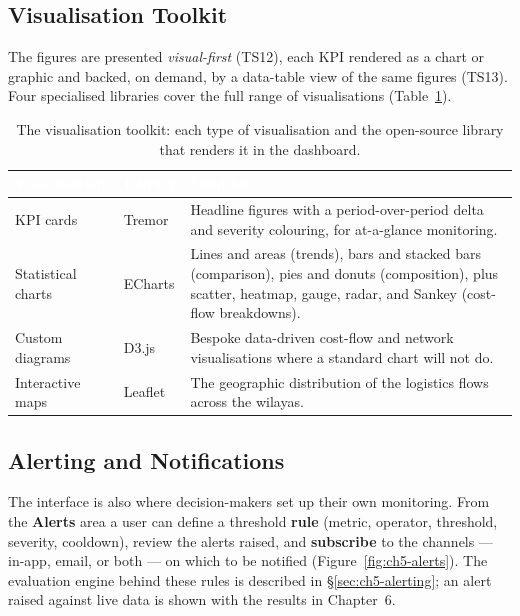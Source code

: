 \subsection{Visualisation Toolkit}

The figures are presented \emph{visual-first} (TS12), each KPI rendered as a chart or graphic and
backed, on demand, by a data-table view of the same figures (TS13). Four specialised libraries cover the
full range of visualisations (Table~\ref{tab:ch5-viz}).

\begin{table}[H]
\centering
\caption{The visualisation toolkit: each type of visualisation and the open-source library that renders
it in the dashboard.}
\label{tab:ch5-viz}
\renewcommand{\arraystretch}{1.35}
\begin{tabularx}{\linewidth}{|>{\raggedright\arraybackslash}p{3.0cm}|>{\raggedright\arraybackslash}p{2.4cm}|>{\raggedright\arraybackslash}X|}
\hline
\rowcolor{tblheader}
\textcolor{white}{\textbf{Visualisation}} & \textcolor{white}{\textbf{Library}} &
\textcolor{white}{\textbf{Used for}} \\
\hline
KPI cards & Tremor & Headline figures with a period-over-period delta and severity colouring, for
at-a-glance monitoring. \\
Statistical charts & ECharts & Lines and areas (trends), bars and stacked bars (comparison), pies and
donuts (composition), plus scatter, heatmap, gauge, radar, and Sankey (cost-flow breakdowns). \\
Custom diagrams & D3.js & Bespoke data-driven cost-flow and network visualisations where a standard
chart will not do. \\
Interactive maps & Leaflet & The geographic distribution of the logistics flows across the wilayas. \\
\hline
\end{tabularx}
\end{table}

\subsection{Alerting and Notifications}

The interface is also where decision-makers set up their own monitoring. From the \textbf{Alerts} area a
user can define a threshold \textbf{rule} (metric, operator, threshold, severity, cooldown), review the
alerts raised, and \textbf{subscribe} to the channels --- in-app, email, or both --- on which to be
notified (Figure~\ref{fig:ch5-alerts}). The evaluation engine behind these rules is described in
\S\ref{sec:ch5-alerting}; an alert raised against live data is shown with the results in Chapter~6.


